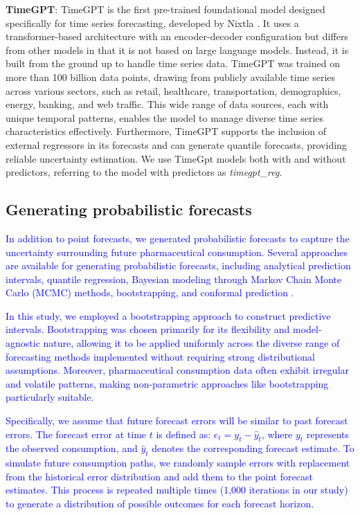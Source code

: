 \documentclass[
  authoryear,
  preprint,
  3p]{elsarticle}
\begin{document}
\textbf{TimeGPT}: TimeGPT is the first pre-trained foundational model
designed specifically for time series forecasting, developed by Nixtla
\citep{garza2023timegpt}. It uses a transformer-based architecture with
an encoder-decoder configuration but differs from other models in that
it is not based on large language models. Instead, it is built from the
ground up to handle time series data. TimeGPT was trained on more than
100 billion data points, drawing from publicly available time series
across various sectors, such as retail, healthcare, transportation,
demographics, energy, banking, and web traffic. This wide range of data
sources, each with unique temporal patterns, enables the model to manage
diverse time series characteristics effectively. Furthermore, TimeGPT
supports the inclusion of external regressors in its forecasts and can
generate quantile forecasts, providing reliable uncertainty estimation.
We use TimeGpt models both with and without predictors, referring to the
model with predictors as \emph{timegpt\_reg}.

\subsection{Generating probabilistic
forecasts}\label{generating-probabilistic-forecasts}

\textcolor{blue}{In addition to point forecasts, we generated probabilistic forecasts to capture the uncertainty surrounding future pharmaceutical consumption. Several approaches are available for generating probabilistic forecasts, including analytical prediction intervals, quantile regression, Bayesian modeling through Markov Chain Monte Carlo (MCMC) methods, bootstrapping, and conformal prediction}
\citep{wang2023}.

\textcolor{blue}{In this study, we employed a bootstrapping approach to construct predictive intervals. Bootstrapping was chosen primarily for its flexibility and model-agnostic nature, allowing it to be applied uniformly across the diverse range of forecasting methods implemented without requiring strong distributional assumptions. Moreover, pharmaceutical consumption data often exhibit irregular and volatile patterns, making non-parametric approaches like bootstrapping particularly suitable.}

\textcolor{blue}{Specifically, we assume that future forecast errors will be similar to past forecast errors. The forecast error at time $t$ is defined as: $e_t = y_t - \hat{y}_t$, where $y_t$ represents the observed consumption, and $\hat{y}_t$ denotes the corresponding forecast estimate. To simulate future consumption paths, we randomly sample errors with replacement from the historical error distribution and add them to the point forecast estimates. This process is repeated multiple times (1,000 iterations in our study) to generate a distribution of possible outcomes for each forecast horizon.}
\end{document}
